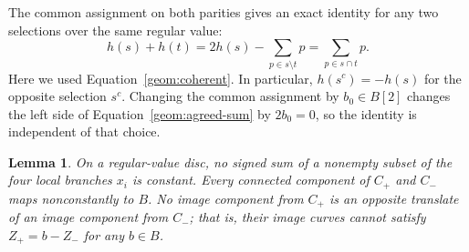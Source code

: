 \documentclass[11pt]{amsart}
\newtheorem{lemma}[theorem]{Lemma}
\theoremstyle{definition}
\theoremstyle{remark}
\numberwithin{equation}{section}
\begin{document}
The common assignment on both parities gives an exact identity for
any two selections over the same regular value:
\begin{equation}\label{geom:agreed-sum}
 h(s)+h(t)=2h(s)-\sum_{p\in s\setminus t}p
          =\sum_{p\in s\cap t}p.
\end{equation}
Here we used Equation~\eqref{geom:coherent}.  In particular,
$h(s^c)=-h(s)$ for the opposite selection $s^c$.  Changing the
common assignment by $b_0\in B[2]$ changes the left side of
Equation~\eqref{geom:agreed-sum} by $2b_0=0$, so the identity is
independent of that choice.

\begin{lemma}\label{geom:relations}
On a regular-value disc, no signed sum of a nonempty subset of the
four local branches $x_i$ is constant.  Every connected component of
$C_+$ and $C_-$ maps nonconstantly to $B$.  No image component from
$C_+$ is an opposite translate of an image component from $C_-$;
that is, their image curves cannot satisfy $Z_+=b-Z_-$ for any
$b\in B$.
\end{lemma}
\end{document}

